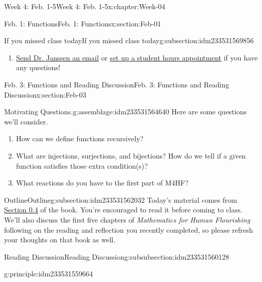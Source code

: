 \documentclass[oneside,10pt,]{book}
\numberwithin{equation}{section}
\begin{document}
\begin{chapterptx}{Week 4: Feb. 1-5}{}{Week 4: Feb. 1-5}{}{}{x:chapter:Week-04}
\begin{sectionptx}{Feb. 1: Functions}{}{Feb. 1: Functions}{}{}{x:section:Feb-01}
\begin{subsectionptx}{If you missed class today}{}{If you missed class today}{}{}{g:subsection:idm233531569856}
\begin{enumerate}
\item{}\href{mailto:mike.janssen@dordt.edu}{Send Dr. Janssen an email} or \href{https://calendly.com/mkjanssen/student-hours}{set up a student hours appointment} if you have any questions!%
\end{enumerate}
\end{subsectionptx}
\end{sectionptx}
%
%
\typeout{************************************************}
\typeout{************************************************}
%
\begin{sectionptx}{Feb. 3: Functions and Reading Discussion}{}{Feb. 3: Functions and Reading Discussion}{}{}{x:section:Feb-03}
\begin{introduction}{}%
\begin{assemblage}{Motivating Questions.}{g:assemblage:idm233531564640}%
Here are some questions we'll consider. %
\begin{enumerate}
\item{}How can we define functions recursively?%
\item{}What are injections, surjections, and bijections? How do we tell if a given function satisfies those extra condition(s)?%
\item{}What reactions do you have to the first part of M4HF?%
\end{enumerate}
%
\end{assemblage}
\end{introduction}%
%
%
\typeout{************************************************}
\typeout{************************************************}
%
\begin{subsectionptx}{Outline}{}{Outline}{}{}{g:subsection:idm233531562032}
Today's material comes from \href{http://discrete.openmathbooks.org/dmoi3/sec_intro-functions.html}{Section 0.4} of the book. You're encouraged to read it before coming to class. We'll also discuss the first five chapters of \emph{Mathematics for Human Flourishing} following on the reading and reflection you recently completed, so please refresh your thoughts on that book as well.%
%
%
\typeout{************************************************}
\typeout{************************************************}
%
\begin{subsubsectionptx}{Reading Discussion}{}{Reading Discussion}{}{}{g:subsubsection:idm233531560128}
\begin{principle}{}{}{g:principle:idm233531559664}%

\end{principle}
\end{subsubsectionptx}
\end{subsectionptx}
\end{sectionptx}
\end{chapterptx}
\end{document}
